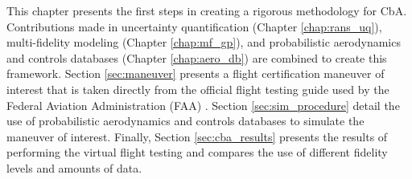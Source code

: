 This chapter presents the first steps in creating a rigorous methodology for CbA.
Contributions made in uncertainty quantification (Chapter \ref{chap:rans_uq}), multi-fidelity modeling (Chapter \ref{chap:mf_gp}), and probabilistic aerodynamics and controls databases (Chapter \ref{chap:aero_db}) are combined to create this framework.
Section \ref{sec:maneuver} presents a flight certification maneuver of interest that is taken directly from the official flight testing guide used by the Federal Aviation Administration (FAA) \cite{romanowski_flight_2018}.
Section \ref{sec:sim_procedure} detail the use of probabilistic aerodynamics and controls databases to simulate the maneuver of interest.
Finally, Section \ref{sec:cba_results} presents the results of performing the virtual flight testing and compares the use of different fidelity levels and amounts of data.